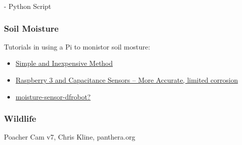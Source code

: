 \documentclass{article}\usepackage[]{graphicx}\usepackage[]{color}
\begin{document}
- Python Script

\subsubsection{Soil Moisture}

Tutorials in using a Pi to monistor soil mosture:

\begin{itemize}

\item \href{https://tutorials-raspberrypi.com/measuring-soil-moisture-with-raspberry-pi/}{Simple and Inexpensive Method}

\item \href{moisture-sensor-dfrobothttps://www.switchdoc.com/2018/11/tutorial-capacitive-moisture-sensor-grove/}{Raspberry 3 and Capacitance Sensors -- More Accurate, limited corrosion}

\item \href{https://tutorials-raspberrypi.com/raspberry-pi-capacitive-spoil-moisture-sensor-dfrobot-gravity/}{moisture-sensor-dfrobot?}
\end{itemize}

\subsubsection{Wildlife}

Poacher Cam v7, Chris Kline, panthera.org
\end{document}
